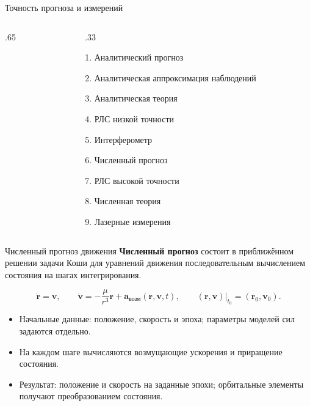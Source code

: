 \documentclass[11pt,aspectratio=169,t]{beamer}
\begin{document}
\begin{frame}{Точность прогноза и измерений}
\begin{columns}[T,onlytextwidth]
\begin{column}{.65\textwidth}\centering

\end{column}
\begin{column}{.33\textwidth}
{\raggedright
\textcolor{courseaccent}{1. Аналитический прогноз}\par
\textcolor{courseaccent}{2. Аналитическая аппроксимация наблюдений}\par
\textcolor{courseaccent}{3. Аналитическая теория}\par
4. РЛС низкой точности\par
5. Интерферометр\par
6. Численный прогноз\par
7. РЛС высокой точности\par
8. Численная теория\par
9. Лазерные измерения\par}
\end{column}
\end{columns}
\end{frame}

\begin{frame}{Численный прогноз движения}
\setlength{\abovedisplayskip}{4pt}\setlength{\belowdisplayskip}{4pt}
\justifying
\textbf{Численный прогноз} состоит в приближённом решении задачи Коши для уравнений движения последовательным вычислением состояния на шагах интегрирования.\par
\[
\dot{\mathbf r}=\mathbf v,\qquad
\dot{\mathbf v}=-\frac{\mu}{r^3}\mathbf r+\mathbf a_{\text{возм}}(\mathbf r,\mathbf v,t),
\qquad (\mathbf r,\mathbf v)\big|_{t_0}=(\mathbf r_0,\mathbf v_0).
\]
\begin{itemize}
\item Начальные данные: положение, скорость и эпоха; параметры моделей сил задаются отдельно.
\item На каждом шаге вычисляются возмущающие ускорения и приращение состояния.
\item Результат: положение и скорость на заданные эпохи; орбитальные элементы получают преобразованием состояния.
\end{itemize}
\end{frame}
\end{document}

